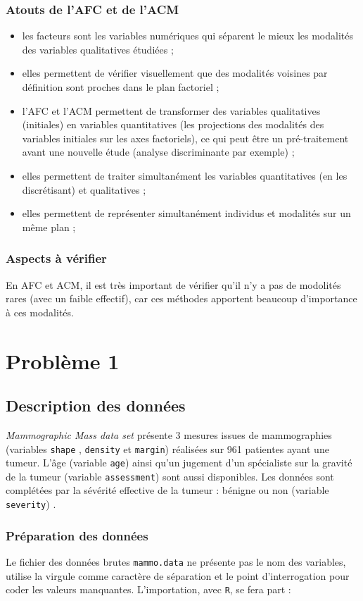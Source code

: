 \documentclass[a4paper]{report}
\begin{document}
\subsection{Atouts de l'AFC et de l'ACM}
\begin{itemize}
 \item les facteurs sont les variables numériques qui séparent le mieux les modalités des variables qualitatives étudiées ;
 \item elles permettent de vérifier visuellement que des modalités voisines par définition sont proches dans le plan factoriel ;
 \item l'AFC et l'ACM permettent de transformer des variables qualitatives (initiales) en variables quantitatives (les projections des modalités des variables initiales sur les axes factoriels), ce qui peut être un pré-traitement avant une nouvelle étude (analyse discriminante par exemple) ;
 \item elles permettent de traiter simultanément les variables quantitatives (en les discrétisant) et qualitatives ; 
 \item elles permettent de représenter simultanément individus et modalités sur un même plan ;
 \end{itemize}
 
 \subsection{Aspects à vérifier}
 En AFC et ACM, il est très important de vérifier qu'il n'y a pas de modolités rares (avec un faible effectif), car ces méthodes apportent beaucoup d'importance à ces modalités. 
 
 
 \chapter{Problème 1}
 
\section{Description des données}

\emph{Mammographic Mass data set} présente 3 mesures issues de mammographies (variables \verb|shape| , \verb|density| et \verb|margin|) réalisées sur 961 patientes ayant une tumeur. L'âge (variable \verb|age|) ainsi qu'un jugement d'un spécialiste sur la gravité de la tumeur (variable \verb|assessment|) sont aussi disponibles. Les données sont complétées par la sévérité effective de la tumeur : bénigne ou non (variable \verb|severity|) . 

\subsection{Préparation des données}
Le fichier des données brutes \verb|mammo.data| ne présente pas le nom des variables, utilise la virgule comme caractère de séparation et le point d'interrogation pour coder les valeurs manquantes. L'importation, avec \verb|R|, se fera part : 

\end{document}
